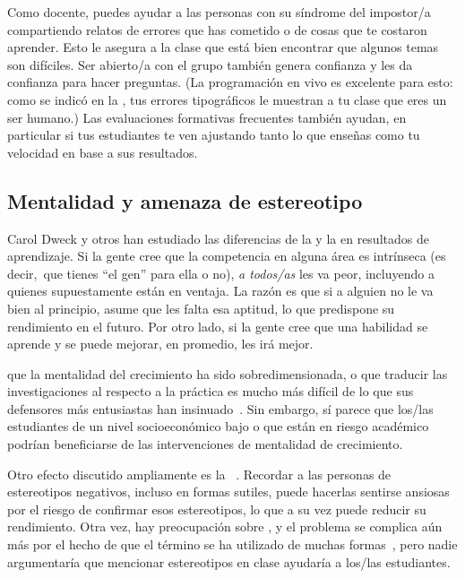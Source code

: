 Como docente,
puedes ayudar a las personas con su síndrome del impostor/a
compartiendo relatos de errores que has cometido o de cosas que te costaron aprender.
Esto le asegura a la clase que está bien encontrar que algunos temas son difíciles.
Ser abierto/a con el grupo también genera confianza
y les da confianza para hacer preguntas.
(La programación en vivo es excelente para esto:
como se indicó en la ,
tus errores tipográficos le muestran a tu clase que eres un ser humano.)
Las evaluaciones formativas frecuentes también ayudan,
en particular si tus estudiantes te ven ajustando tanto lo que enseñas como tu velocidad
en base a sus resultados.

\subsection*{Mentalidad y amenaza de estereotipo}

Carol Dweck y otros
han estudiado las diferencias de la 
y la  en resultados de aprendizaje.
Si la gente cree que la competencia en alguna área es intrínseca
(es decir,\ que tienes ``el gen'' para ella o no),
\emph{a todos/as} les va peor,
incluyendo a quienes supuestamente están en ventaja.
La razón es que si a alguien no le va bien al principio,
asume que les falta esa aptitud,
lo que predispone su rendimiento en el futuro.
Por otro lado,
si la gente cree que una habilidad se aprende y se puede mejorar,
en promedio, les irá mejor.

que la mentalidad del crecimiento ha sido sobredimensionada,
o que traducir las investigaciones al respecto a la práctica
es mucho más difícil
de lo que sus defensores más entusiastas han insinuado~\cite{Sisk2018}.
Sin embargo,
sí parece que los/las estudiantes de un nivel socioeconómico bajo o que están en riesgo académico podrían beneficiarse de las intervenciones de mentalidad de crecimiento.

Otro efecto discutido ampliamente es la ~\cite{Stee2011}.
Recordar a las personas de estereotipos negativos,
incluso en formas sutiles,
puede hacerlas sentirse ansiosas por el riesgo de confirmar esos estereotipos,
lo que a su vez puede reducir su rendimiento.
Otra vez,
hay preocupación sobre
,
y el problema se complica aún más por el hecho de que el término se ha utilizado de muchas formas~\cite{Shap2007},
pero nadie argumentaría que mencionar estereotipos en clase ayudaría a los/las estudiantes.

